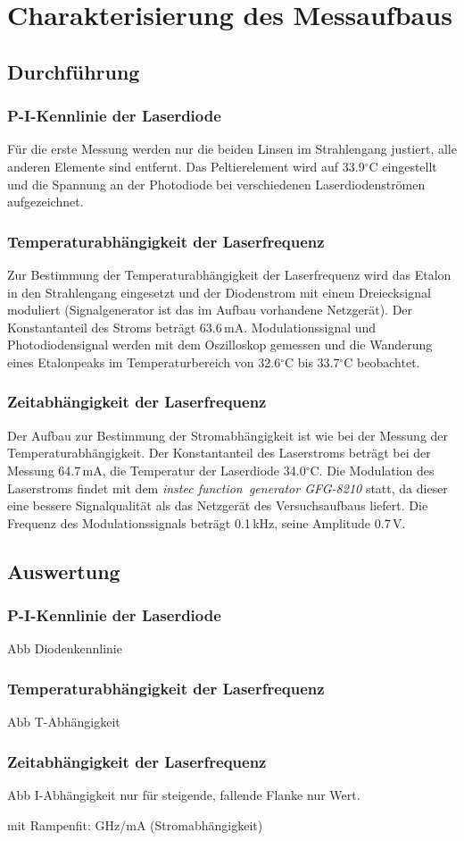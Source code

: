 \section{Charakterisierung des Messaufbaus}
\subsection{Durchführung}
\label{sect:durchführung}
\subsubsection*{P-I-Kennlinie der Laserdiode}
Für die erste Messung werden nur die beiden Linsen im Strahlengang justiert, alle anderen Elemente sind entfernt. 
Das Peltierelement wird auf 33.9$^\circ$C eingestellt und die Spannung an der
Photodiode bei verschiedenen Laserdiodenströmen aufgezeichnet.

\subsubsection*{Temperaturabhängigkeit der Laserfrequenz}
Zur Bestimmung der Temperaturabhängigkeit der
Laserfrequenz wird das Etalon in den Strahlengang eingesetzt und der Diodenstrom mit einem Dreiecksignal moduliert
(Signalgenerator ist das im Aufbau vorhandene Netzgerät).
Der Konstantanteil des Stroms beträgt 63.6\,mA.
Modulationssignal und Photodiodensignal werden mit dem Oszilloskop gemessen und die Wanderung eines Etalonpeaks
im Temperaturbereich von 32.6$^\circ$C bis 33.7$^\circ$C beobachtet.

\subsubsection*{Zeitabhängigkeit der Laserfrequenz}
Der Aufbau zur Bestimmung der Stromabhängigkeit ist
wie bei der Messung der Temperaturabhängigkeit.
Der Konstantanteil des Laserstroms beträgt bei der Messung 64.7\,mA,
die Temperatur der Laserdiode 34.0$^\circ$C.
Die Modulation des Laserstroms findet mit dem \emph{instec function~generator GFG-8210} statt,
da dieser eine bessere Signalqualität als das Netzgerät des Versuchsaufbaus liefert.
Die Frequenz des Modulationssignals beträgt 0.1\,kHz, seine Amplitude 0.7\,V.

\subsection{Auswertung}
\subsubsection*{P-I-Kennlinie der Laserdiode}
Abb Diodenkennlinie

\subsubsection*{Temperaturabhängigkeit der Laserfrequenz}
Abb T-Abhängigkeit

\subsubsection*{Zeitabhängigkeit der Laserfrequenz} 

Abb I-Abhängigkeit nur für steigende,
fallende Flanke nur Wert.

mit Rampenfit: GHz/mA (Stromabhängigkeit)